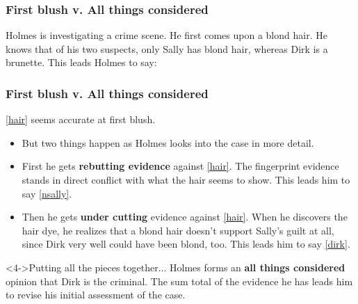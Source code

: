 \documentclass[10pt,letterpaper,xcolor=dvipsnames,handout]{beamer}
\begin{document}
\begin{frame}
\frametitle{First blush v. All things considered}

Holmes is investigating a crime scene. He first comes upon a blond hair. He knows that of his two suspects, only Sally has blond hair, whereas Dirk is a brunette.  This leads Holmes to say:






\end{frame}

\begin{frame}
\frametitle{First blush v. All things considered}

\begin{block}{\ref{hair} seems accurate at first blush.}
  \begin{itemize}
    \item But two things happen as Holmes looks into the case in more detail.
    \item<2-> First he gets \textbf{rebutting evidence} against \ref{hair}.  The fingerprint evidence stands in direct conflict with what the hair seems to show. This leads him to say \ref{nsally}.
    \item<3-> Then he gets \textbf{under cutting} evidence against \ref{hair}. When he discovers the hair dye, he realizes that a blond hair doesn't support Sally's guilt at all, since Dirk very well could have been blond, too. This leads him to say \ref{dirk}.
  \end{itemize} 
\end{block}

\begin{block}<4->{Putting all the pieces together...}
  Holmes forms an \textbf{all things considered} opinion that Dirk is the criminal. The sum total of the evidence he has leads him to revise his initial assessment of the case.
\end{block} 

\end{frame}
\end{document}
